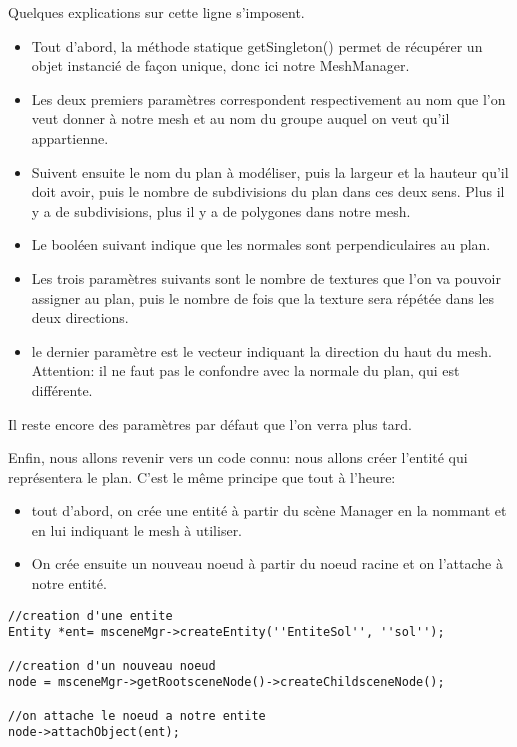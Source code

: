 \documentclass[10pt,a4paper]{report}
\begin{document}
Quelques explications sur cette ligne s'imposent. 
\begin{itemize}
\item Tout d'abord, la m\'ethode statique getSingleton() permet de r\'ecup\'erer un objet instanci\'e de fa\c{c}on unique, donc ici notre MeshManager.
\item Les deux premiers param\`etres correspondent respectivement au nom que l'on veut donner \`{a} notre mesh et au nom du groupe auquel on veut qu'il appartienne. 
\item Suivent ensuite le nom du plan \`{a} mod\'eliser, puis la largeur et la hauteur qu'il doit avoir, puis le nombre de subdivisions du plan dans ces deux sens. Plus il y a de subdivisions, plus il y a de polygones dans notre mesh. 
\item Le bool\'een suivant indique que les normales sont perpendiculaires au plan.
\item Les trois param\`etres suivants sont le nombre de textures que l'on va pouvoir assigner au plan, puis le nombre de fois que la texture sera r\'ep\'et\'ee dans les deux directions. 
\item le dernier param\`etre est le vecteur indiquant la direction du haut du mesh. Attention: il ne faut pas le confondre avec la normale du plan, qui est diff\'erente.
\end{itemize}

Il reste encore des param\`etres par d\'efaut que l'on verra plus tard.

Enfin, nous allons revenir vers un code connu: nous allons cr\'eer l'entit\'e qui repr\'esentera le plan. C'est le m\^eme principe que tout \`{a} l'heure:
\begin{itemize} 
\item tout d'abord, on cr\'ee une entit\'e \`{a} partir du sc\`ene Manager en la nommant et en lui indiquant le mesh \`{a} utiliser. 
\item On cr\'ee ensuite un nouveau noeud \`{a} partir du noeud racine et on l'attache \`{a} notre entit\'e.
\end{itemize}

\begin{lstlisting}
//creation d'une entite
Entity *ent= msceneMgr->createEntity(''EntiteSol'', ''sol'');

//creation d'un nouveau noeud
node = msceneMgr->getRootsceneNode()->createChildsceneNode();

//on attache le noeud a notre entite
node->attachObject(ent);
\end{lstlisting}
\end{document}
